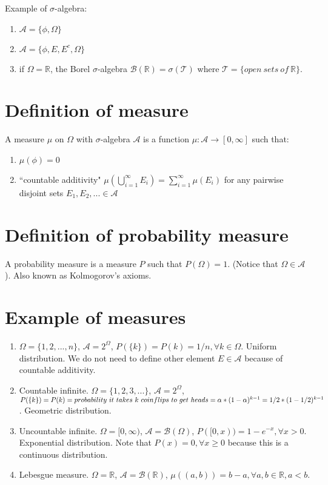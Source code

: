 \documentclass[12pt]{article}
\newcommand{\A}{\mathcal{A}}
\newcommand{\B}{\mathcal{B}}
\newcommand{\T}{\mathcal{T}}
\begin{document}
Example of $\sigma$-algebra:
\begin{enumerate}
    \item $\A=\{\phi, \Omega\}$
    \item $\A=\{\phi,E, E^c, \Omega\}$
    \item if $\Omega = \mathbb{R}$, the Borel $\sigma$-algebra $\B(\mathbb{R})=\sigma(\T)$ where
        $\T=\{open\ sets\ of\ \mathbb{R}\}$.
\end{enumerate}

\section{Definition of measure}

A measure $\mu$ on $\Omega$ with $\sigma$-algebra $\A$ is a function
$\mu: \A \rightarrow [0,\infty]$ such that:

\begin{enumerate}
    \item $\mu(\phi) = 0$
    \item ``countable additivity" $\mu(\bigcup\limits_{i=1}^{\infty} E_i)=\sum\limits_{i=1}^{\infty} \mu(E_i)$ for any pairwise disjoint sets $E_1, E_2, ... \in \A$ 
\end{enumerate}

\section{Definition of probability measure}

A probability measure is a measure $P$ such that $P(\Omega) = 1$. (Notice that $\Omega\in \A$). Also known as Kolmogorov's axioms.

\section{Example of measures}

\begin{enumerate}
\item $\Omega=\{1,2,...,n\}$, $\A=2^\Omega$, 
$P(\{k\})=P(k)=1/n,\forall k\in\Omega$. Uniform distribution. We do
not need to define other element $E\in\A$ because of countable
additivity.

\item Countable infinite. $\Omega=\{1,2,3,...\}$, $\A=2^\Omega$,
$P(\{k\})=P(k)=\\ probability\ it\ takes\ k\ coinflips\ to\ get\ heads
=\alpha * (1-\alpha)^{k-1}=1/2 * (1 - 1/2)^{k-1}$. Geometric distribution.

\item Uncountable infinite. $\Omega=[0,\infty)$, $\A=\B(\Omega)$,
$P([0,x))=1-e^{-x}, \forall x>0$. Exponential distribution. Note
that $P({x})=0,\forall x\ge 0$ because this is a continuous distribution.

\item Lebesgue measure. $\Omega=\mathbb{R}$, $\A=\B(\mathbb{R})$,
$\mu((a,b)) = b - a,\forall a,b\in\mathbb{R},a<b$. 
\end{enumerate}
\end{document}
